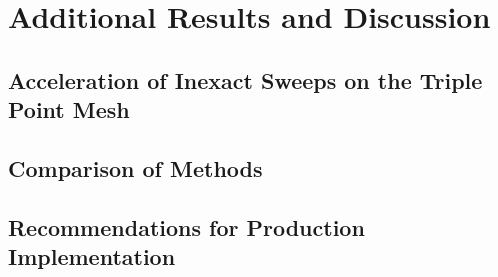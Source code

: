 \documentclass[../doc.tex]{subfiles}
\begin{document}
\chapter{Additional Results and Discussion}
\section{Acceleration of Inexact Sweeps on the Triple Point Mesh}

\begin{table}
\centering
\caption{}
\label{disc:mult_sweeps}

\end{table}

\begin{table}
\centering
\caption{}
\label{disc:anderson}

\end{table}

\section{Comparison of Methods}

\section{Recommendations for Production Implementation}
\end{document}

